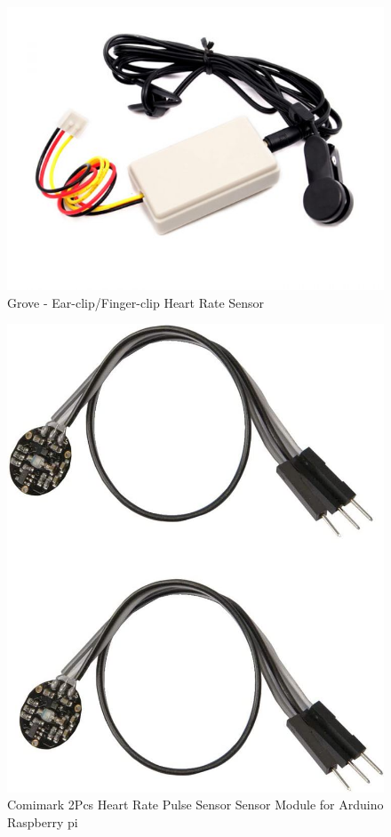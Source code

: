 \documentclass[12pt, titlepage]{article}
\begin{document}
\begin{figure}[H]
\centering
\includegraphics[scale = 0.5]{grove2}
  \caption{Grove - Ear-clip/Finger-clip Heart Rate Sensor}
  \label{fig:grove2}
\end{figure}

\begin{figure}[H]
\centering
\includegraphics[scale = 0.25]{knockoff}
  \caption{Comimark 2Pcs Heart Rate Pulse Sensor Sensor Module for Arduino Raspberry pi}
  \label{fig:knockoff}
\end{figure}
\end{document}
